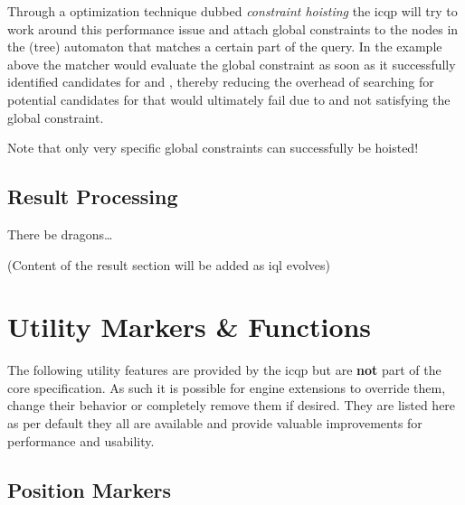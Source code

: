 \documentclass[11pt,a4paper]{report}
\begin{document}
Through a optimization technique dubbed \textit{constraint hoisting} the \ac{icqp} will try to work around this performance issue and attach global constraints to the nodes in the (tree) automaton that matches a certain part of the query.
In the example above the matcher would evaluate the global constraint  as soon as it successfully identified candidates for  and , thereby reducing the overhead of searching for potential candidates for  that would ultimately fail due to  and  not satisfying the global constraint.

Note that only very specific global constraints can successfully be hoisted! 

\section{Result Processing}
\label{sec:result-processing}

There be dragons\dots

(Content of the result section will be added as \ac{iql} evolves)

\chapter{Utility Markers \& Functions}
\label{chap:utility}

The following utility features are provided by the \ac{icqp} but are \textbf{not} part of the core specification. 
As such it is possible for engine extensions to override them, change their behavior or completely remove them if desired.
They are listed here as per default they all are available and provide valuable improvements for performance and usability.

\section{Position Markers}
\label{sec:position-markers}
\end{document}
